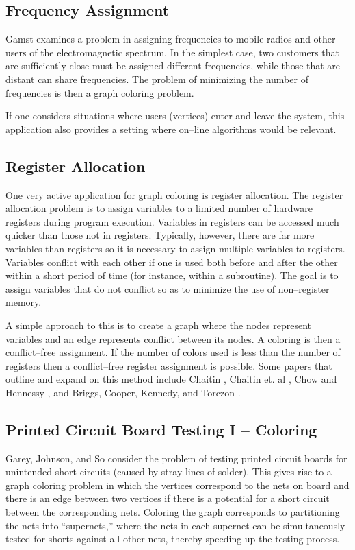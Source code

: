 \subsection{Frequency Assignment}  Gamst \cite{Ga86} examines a
problem in assigning frequencies to mobile radios and other users of
the electromagnetic spectrum.  In the simplest case, two customers
that are sufficiently close must be assigned different frequencies,
while those that are distant can share frequencies.  The problem of
minimizing the number of frequencies is then a graph coloring problem.

If one considers situations where users (vertices) enter and leave
the system, this application also provides a setting where on--line
algorithms would be relevant.

\subsection{Register Allocation}  One very active application for
graph coloring is register allocation.  The register allocation
problem is to assign variables to a limited number of hardware
registers during program execution.  Variables in registers can be
accessed much quicker than those not in registers. Typically, however,
there are far more variables than registers so it is necessary to
assign multiple variables to registers.  Variables conflict with each
other if one is used both before and after the other within a short period
of time (for instance, within a subroutine).  The goal is to assign variables
that do not conflict so as to minimize the use of non--register memory.

A simple approach to this is to create a graph where the nodes
represent variables and an edge represents conflict between its nodes.
A coloring is then a conflict--free assignment.  If the number of
colors used is less than the number of registers then a conflict--free
register assignment is possible.  Some papers that outline and expand
on this method include Chaitin \cite{Ch82}, Chaitin et. al
\cite{CACCHM81}, Chow and Hennessy \cite{ChHe84,ChHe90}, and
Briggs, Cooper, Kennedy, and Torczon \cite{BCKT89}.

\subsection{Printed Circuit Board Testing I -- Coloring}  Garey, Johnson,
and So \cite{GJS76} consider the problem of testing printed circuit boards
for unintended short circuits (caused by stray lines of solder).  This gives
rise to a graph coloring problem in which the vertices correspond to the nets
on board and there is an edge between two vertices if there is a potential
for a short circuit between the corresponding nets.  Coloring the graph
corresponds to partitioning the nets into ``supernets,'' where the nets
in each supernet can be simultaneously tested for shorts against all
other nets, thereby speeding up the testing process. 

